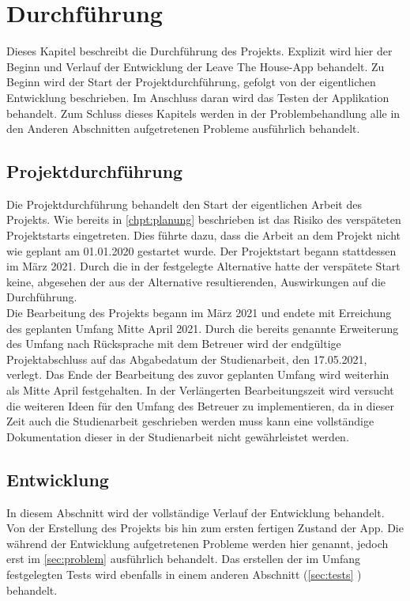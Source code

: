 \chapter{Durchführung}\label{chpt:durchfuerung}

Dieses Kapitel beschreibt die Durchführung des Projekts. Explizit wird hier der Beginn und Verlauf der Entwicklung der \glqq Leave The House\grqq-App behandelt. Zu Beginn wird der Start der Projektdurchführung, gefolgt von der eigentlichen Entwicklung beschrieben. Im Anschluss daran wird das Testen der Applikation behandelt. Zum Schluss dieses Kapitels werden in der Problembehandlung alle in den Anderen Abschnitten aufgetretenen Probleme ausführlich behandelt.

\section{Projektdurchführung}\label{sec:projektdurchfuerung}

Die Projektdurchführung behandelt den Start der eigentlichen Arbeit des Projekts. Wie bereits in \autoref{chpt:planung} beschrieben ist das Risiko des verspäteten Projektstarts eingetreten. Dies führte dazu, dass die Arbeit an dem Projekt nicht wie geplant am 01.01.2020 gestartet wurde. Der Projektstart begann stattdessen im März 2021. Durch die in der  festgelegte Alternative hatte der verspätete Start keine, abgesehen der aus der Alternative resultierenden, Auswirkungen auf die Durchführung.\\
Die Bearbeitung des Projekts begann im März 2021 und endete mit Erreichung des geplanten Umfang Mitte April 2021. Durch die bereits genannte Erweiterung des Umfang nach Rücksprache mit dem Betreuer wird der endgültige Projektabschluss auf das Abgabedatum der Studienarbeit, den 17.05.2021, verlegt. Das Ende der Bearbeitung des zuvor geplanten Umfang wird weiterhin als Mitte April festgehalten. In der Verlängerten Bearbeitungszeit wird versucht die weiteren Ideen für den Umfang des Betreuer zu implementieren, da in dieser Zeit auch die Studienarbeit geschrieben werden muss kann eine vollständige Dokumentation dieser in der Studienarbeit nicht gewährleistet werden.

\section{Entwicklung}\label{sec:entwicklung}
In diesem Abschnitt wird der vollständige Verlauf der Entwicklung behandelt. Von der Erstellung des Projekts bis hin zum ersten fertigen Zustand der App. Die während der Entwicklung aufgetretenen Probleme werden hier genannt, jedoch erst im \autoref{sec:problem}  ausführlich behandelt. Das erstellen der im Umfang festgelegten Tests wird ebenfalls in einem anderen Abschnitt (\ref{sec:tests} ) behandelt.

